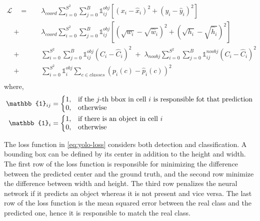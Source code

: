 \begin{equation}\label{eq:yolo-loss}
    \begin{split}
        \mathcal{L} \quad =  \quad  &
            \lambda_{coord} \sum_{i=0}^{S^2} \sum_{j=0}^{B} \mathbb{1}_{ij}^{obj}
            [(x_i - \hat x_i)^2 + (y_i - \hat y_i)^2]\\
            \quad + \quad & \lambda_{coord} \sum_{i=0}^{S^2} \sum_{j=0}^{B} \mathbb{1}_{ij}^{obj}
                [(\sqrt{w_i} - \sqrt{\hat w_i})^2 + (\sqrt{h_i} - \sqrt{\hat h_i})^2]\\
            \quad + \quad & \sum_{i=0}^{S^2} \sum_{j=0}^{B} \mathbb{1}_{ij}^{obj}
                (C_i - \hat C_i)^2 \; + \; \lambda_{noobj} \sum_{i=0}^{S^2} \sum_{j=0}^{B} \mathbb{1}_{ij}^{noobj}(C_i - \hat C_i)^2\\
            \quad + \quad & \sum_{i=0}^{S^2} \mathbb{1}_{i}^{obj} \sum_{c \in classes}
                (p_i(c) - \hat p_i (c))^2\\
    \end{split}
\end{equation}
where,
\begin{align*}
    \mathbb{1}_{ij}&=\left\{
        \begin{array}{@{}ll@{}}
            1, & \text{if the } j \text{-th bbox in cell } i \text{ is responsible fot that prediction}\\
            0, & \text{otherwise}
        \end{array}\right.\\
    \mathbb{1}_{i}&=\left\{
        \begin{array}{@{}ll@{}}
            1, & \text{if there is an object in cell}\ i \\
            0, & \text{otherwise}
        \end{array}\right.
\end{align*}


The loss function in \autoref{eq:yolo-loss} considers both detection and classification. A bounding box can be defined by its center in addition to the height and width. The first row of the loss function is responsible for minimizing the difference between the predicted center and the ground truth, and the second row minimize the difference between width and height.
The third row penalizes the neural network if it predicts an object whereas it is not present and vice versa. The last row of the loss function is the mean squared error between the real class and the predicted one, hence it is responsible to match the real class.


